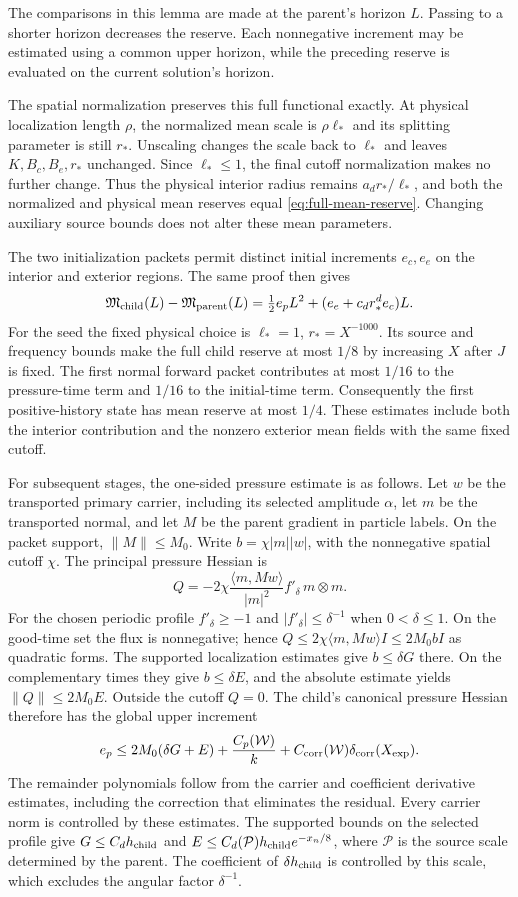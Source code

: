 \documentclass[11pt]{article}
\theoremstyle{definition}
\begin{document}
The comparisons in this lemma are made at the parent's horizon $L$.
Passing to a shorter horizon decreases the reserve. Each nonnegative
increment may be estimated using a common upper horizon, while the
preceding reserve is evaluated on the current solution's horizon.

The spatial normalization preserves this full functional exactly.
At physical localization length $\rho$, the normalized mean scale is
$\rho\ell_*$ and its splitting parameter is still $r_*$. Unscaling
changes the scale back to $\ell_*$ and leaves $K,B_c,B_e,r_*$ unchanged.
Since $\ell_*\leq1$, the final cutoff normalization makes no further
change. Thus the physical interior radius remains $a_dr_*/\ell_*$,
and both the normalized and physical mean reserves equal
\eqref{eq:full-mean-reserve}. Changing auxiliary source bounds does
not alter these mean parameters.

The two initialization packets permit distinct initial increments $e_c,e_e$
on the interior and exterior regions. The same proof then gives
\[
 \mathfrak M_{\rm child}(L)-\mathfrak M_{\rm parent}(L)
      =\tfrac12 e_pL^2+(e_e+c_dr_*^de_c)L.
\]
For the seed the fixed physical choice is
$\ell_*=1$, $r_*=X^{-1000}$. Its source and frequency bounds
make the full child reserve at most $1/8$ by increasing $X$ after
$J$ is fixed. The first normal forward packet contributes at most $1/16$
to the pressure-time term and $1/16$ to the initial-time term.
Consequently the first positive-history state has mean reserve at most
$1/4$. These estimates include both the interior contribution and
the nonzero exterior mean fields with the same fixed cutoff.

For subsequent stages, the one-sided pressure estimate is as follows.
Let $w$ be the transported primary carrier, including its selected
amplitude $\alpha$, let $m$ be the transported normal, and let
$M$ be the parent gradient in particle labels. On the packet support,
$\|M\|\leq M_0$. Write $b=\chi|m||w|$, with the nonnegative
spatial cutoff $\chi$. The principal pressure Hessian is
\[
 Q=-2\chi\frac{\langle m,Mw\rangle}{|m|^2}
                   f'_\delta\,m\otimes m.
\]
For the chosen periodic profile $f'_\delta\geq-1$ and
$|f'_\delta|\leq\delta^{-1}$ when $0<\delta\leq1$.
On the good-time set the flux is nonnegative; hence
$Q\leq2\chi\langle m,Mw\rangle I\leq2M_0bI$ as quadratic forms.
The supported localization estimates give $b\leq\delta G$ there.
On the complementary times they give $b\leq\delta E$, and the
absolute estimate yields $\|Q\|\leq2M_0E$. Outside the cutoff $Q=0$.
The child's canonical pressure Hessian therefore has the global upper
increment
\[
 e_p\leq2M_0(\delta G+E)
       +\frac{C_p(\mathcal W)}k
       +C_{\rm corr}(\mathcal W)\delta_{\rm corr}(X_{\rm exp}).
\]
The remainder polynomials follow from the carrier and
coefficient derivative estimates, including the correction that eliminates
the residual. Every carrier norm is controlled by these estimates.
The supported bounds on the selected profile give
$G\leq C_d h_{\rm child}$ and
$E\leq C_d(\mathcal P)h_{\rm child}e^{-x_n/8}$, where
$\mathcal P$ is the source scale determined by the parent. The
coefficient of $\delta h_{\rm child}$ is controlled by this scale,
which excludes the angular factor $\delta^{-1}$.
\end{document}
